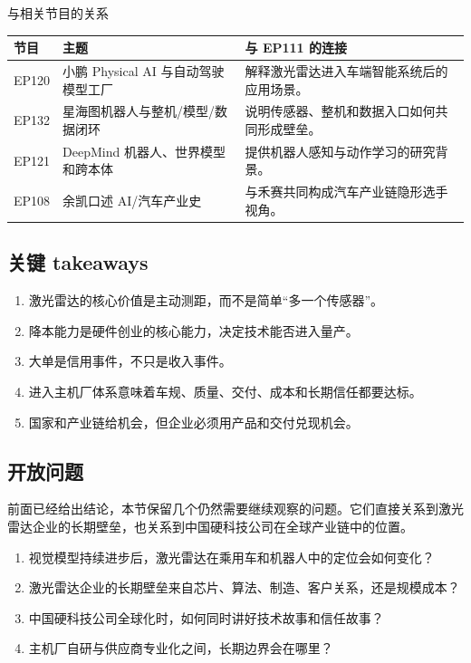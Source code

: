\documentclass[a4paper]{article}
\begin{document}
\begin{knowledgebox}{与相关节目的关系}
\begin{tabularx}{\textwidth}{p{}p{}X}
\toprule
节目 & 主题 & 与 EP111 的连接 \\
\midrule
EP120 & 小鹏 Physical AI 与自动驾驶模型工厂 & 解释激光雷达进入车端智能系统后的应用场景。 \\
EP132 & 星海图机器人与整机/模型/数据闭环 & 说明传感器、整机和数据入口如何共同形成壁垒。 \\
EP121 & DeepMind 机器人、世界模型和跨本体 & 提供机器人感知与动作学习的研究背景。 \\
EP108 & 余凯口述 AI/汽车产业史 & 与禾赛共同构成汽车产业链隐形选手视角。 \\
\bottomrule
\end{tabularx}
\end{knowledgebox}

\subsection{关键 takeaways}

\begin{enumerate}
\item 激光雷达的核心价值是主动测距，而不是简单“多一个传感器”。
\item 降本能力是硬件创业的核心能力，决定技术能否进入量产。
\item 大单是信用事件，不只是收入事件。
\item 进入主机厂体系意味着车规、质量、交付、成本和长期信任都要达标。
\item 国家和产业链给机会，但企业必须用产品和交付兑现机会。
\end{enumerate}

\subsection{开放问题}

前面已经给出结论，本节保留几个仍然需要继续观察的问题。它们直接关系到激光雷达企业的长期壁垒，也关系到中国硬科技公司在全球产业链中的位置。

\begin{enumerate}
\item 视觉模型持续进步后，激光雷达在乘用车和机器人中的定位会如何变化？
\item 激光雷达企业的长期壁垒来自芯片、算法、制造、客户关系，还是规模成本？
\item 中国硬科技公司全球化时，如何同时讲好技术故事和信任故事？
\item 主机厂自研与供应商专业化之间，长期边界会在哪里？
\end{enumerate}
\end{document}

